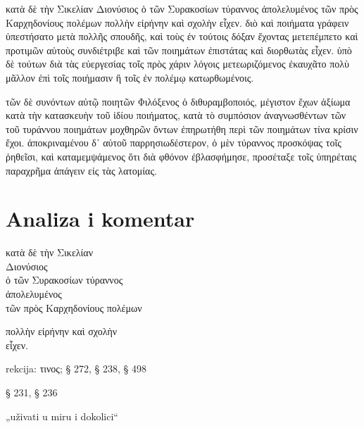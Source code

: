 {\large

\begin{greek}

\noindent κατὰ δὲ τὴν Σικελίαν Διονύσιος ὁ τῶν Συρακοσίων τύραννος ἀπολελυμένος τῶν πρὸς Καρχηδονίους πολέμων πολλὴν εἰρήνην καὶ σχολὴν εἶχεν. διὸ καὶ ποιήματα γράφειν ὑπεστήσατο μετὰ πολλῆς σπουδῆς, καὶ τοὺς ἐν τούτοις δόξαν ἔχοντας μετεπέμπετο καὶ προτιμῶν αὐτοὺς συνδιέτριβε καὶ τῶν ποιημάτων ἐπιστάτας καὶ διορθωτὰς εἶχεν. ὑπὸ δὲ τούτων διὰ τὰς εὐεργεσίας τοῖς πρὸς χάριν λόγοις μετεωριζόμενος ἐκαυχᾶτο πολὺ μᾶλλον ἐπὶ τοῖς ποιήμασιν ἢ τοῖς ἐν πολέμῳ κατωρθωμένοις.

τῶν δὲ συνόντων αὐτῷ ποιητῶν Φιλόξενος ὁ διθυραμβοποιός, μέγιστον ἔχων ἀξίωμα κατὰ τὴν κατασκευὴν τοῦ ἰδίου ποιήματος, κατὰ τὸ συμπόσιον ἀναγνωσθέντων τῶν τοῦ τυράννου ποιημάτων μοχθηρῶν ὄντων ἐπηρωτήθη περὶ τῶν ποιημάτων τίνα κρίσιν ἔχοι. ἀποκριναμένου δ᾽ αὐτοῦ παρρησιωδέστερον, ὁ μὲν τύραννος προσκόψας τοῖς ῥηθεῖσι, καὶ καταμεμψάμενος ὅτι διὰ φθόνον ἐβλασφήμησε, προσέταξε τοῖς ὑπηρέταις παραχρῆμα ἀπάγειν εἰς τὰς λατομίας.

\end{greek}

}


\section*{Analiza i komentar}



{\large
\begin{greek}
\noindent κατὰ δὲ τὴν Σικελίαν \\
Διονύσιος \\
\tabto{2em} ὁ τῶν Συρακοσίων τύραννος \\
\tabto{2em} ἀπολελυμένος \\
\tabto{4em} τῶν πρὸς Καρχηδονίους πολέμων

πολλὴν εἰρήνην καὶ σχολὴν \\
εἶχεν.\\

\end{greek}
}

\begin{description}[noitemsep]
\item[ἀπολελυμένος] rekcija: τινος; § 272, § 238, § 498
\item[εἶχεν] § 231, § 236
\item[εἰρήνην καὶ σχολὴν εἶχεν] „uživati u miru i dokolici“

\end{description}

